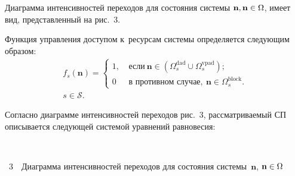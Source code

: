 \begin{multicols}{2}
Диаграмма интенсивностей переходов для состояния системы 
$\mathbf{n},\mathbf{n}\hm\in\Omega$, имеет вид, представленный 
на рис.~3.




Функция управления доступом к~ресурсам сис\-те\-мы определяется следующим образом:
\begin{multline*}
f_s\left(\mathbf{n}\right) =
\begin{cases}
1,  &\ \mbox{если}\ 
\mathbf{n}\in\left(\Omega_s^{\mathrm{dad}}\cup\Omega_s^{\mathrm{vpad}}\right);\\
0           &\ \mbox{в\ противном\ случае},\ 
\mathbf{n}\in\Omega_s^{\mathrm{block}}.
\end{cases}\\
s\in\mathcal{S}.
\end{multline*}

Согласно диаграмме интенсивностей переходов рис.~3, 
рассматриваемый СП описывается сле\-ду\-ющей сис\-те\-мой урав\-не\-ний рав\-но\-ве\-сия:

{ \begin{center}  %
 \vspace*{6pt}
    \mbox{%
\epsfxsize=76.958mm
}

\end{center}



\noindent
{{\figurename~3}\ \ \small{Диаграмма интенсивностей переходов для состояния 
системы~$\mathbf{n}$, $\mathbf{n}\hm\in\Omega$
}}}


\addtocounter{figure}{1}


\end{multicols}

